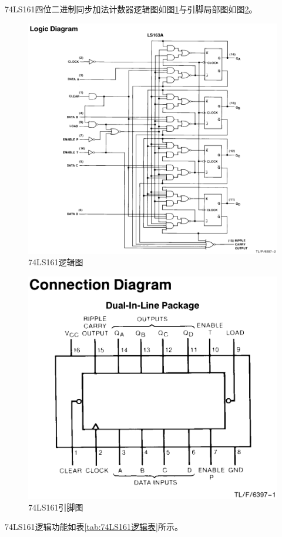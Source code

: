 \documentclass{ctexrep}
\begin{document}
74LS161四位二进制同步加法计数器逻辑图如图\ref{fig:74LS161逻辑图}与引脚局部图如图\ref{fig:74LS161引脚图}。

\begin{figure}[htbp]
	\centering
	\includegraphics[width=.5\linewidth]{74LS161001.png}
	\caption{74LS161逻辑图}
	\label{fig:74LS161逻辑图}
\end{figure}

\begin{figure}[htbp]
	\centering
	\includegraphics[width=.5\linewidth]{74LS161002.png}
	\caption{74LS161引脚图}
	\label{fig:74LS161引脚图}
\end{figure}

74LS161逻辑功能如表\ref{tab:74LS161逻辑表}所示。
\end{document}
